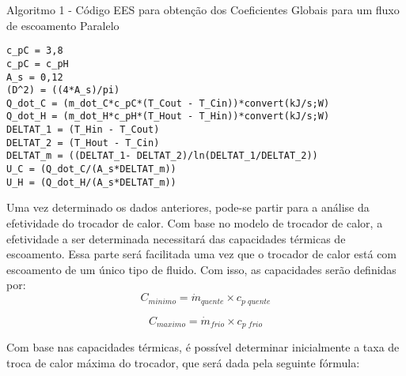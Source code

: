 \documentclass[a4paper,12pt,oneside]{article}
\begin{document}
\begin{flushright}

\lstset{style=mystyle}
\begin{center}
\normalsize{Algoritmo 1 - Código EES para obtenção dos Coeficientes Globais para um fluxo de escoamento Paralelo}
\end{center}

\begin{lstlisting}
c_pC = 3,8
c_pC = c_pH
A_s = 0,12
(D^2) = ((4*A_s)/pi)
Q_dot_C = (m_dot_C*c_pC*(T_Cout - T_Cin))*convert(kJ/s;W)
Q_dot_H = (m_dot_H*c_pH*(T_Hout - T_Hin))*convert(kJ/s;W)
DELTAT_1 = (T_Hin - T_Cout)
DELTAT_2 = (T_Hout - T_Cin)
DELTAT_m = ((DELTAT_1- DELTAT_2)/ln(DELTAT_1/DELTAT_2))
U_C = (Q_dot_C/(A_s*DELTAT_m))
U_H = (Q_dot_H/(A_s*DELTAT_m))
\end{lstlisting}
\vspace{0.5cm}


Uma vez determinado os dados anteriores, pode-se partir para a análise da efetividade do trocador de calor. Com base no modelo de trocador de calor, a efetividade a ser determinada necessitará das capacidades térmicas de escoamento. Essa parte será facilitada uma vez que o trocador de calor está com escoamento de um único tipo de fluido. Com isso, as capacidades serão definidas por:\\

\begin{equation}\label{eq42}
C_{minimo} = \dot{m}_{quente} \times c_{p\,\,quente}
\end{equation}
\vspace{0.5cm}

\begin{equation}\label{eq43}
C_{maximo} = \dot{m}_{frio} \times c_{p\,\,frio}
\end{equation}
\vspace{0.5cm}

Com base nas capacidades térmicas, é possível determinar inicialmente a taxa de troca de calor máxima do trocador, que será dada pela seguinte fórmula:\\


\end{flushright}
\end{document}
